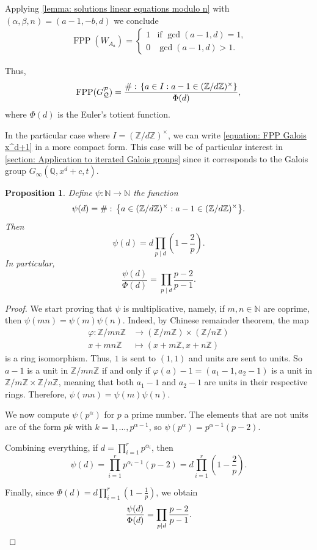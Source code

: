 \documentclass{amsart}
\def\set#1{{\def\st{\;:\;}\left\{#1\right\}}}
\def\ZZ{\mathbb Z}
\def\QQ{\mathbb Q}
\def\NN{\mathbb N}
\DeclareMathOperator{\FPP}{FPP}
\DeclareMathOperator{\st}{st}
\newtheorem{Proposition}{Proposition}[section]
\begin{document}
Applying \cref{lemma: solutions linear equations modulo n} with $(\alpha, \beta, n) = (a-1, -b, d)$ we conclude  
\begin{align*}
\FPP(W_{A_a}) = \left \{ \begin{matrix} 1 & \mbox{if $\gcd(a-1,d) = 1$,} \\ 
0 & \mbox{$\gcd(a-1,d) > 1$.}
\end{matrix}\right.
\end{align*}

Thus,
\begin{align}
\FPP(G_\mathcal{Q}^\mathcal{P}) = \frac{\#\set{a \in I: a-1 \in (\ZZ/d\ZZ)^\times}}{\Phi(d)},
\label{equation: FPP Galois x^d+1}
\end{align}
where $\Phi(d)$ is the Euler's totient function. 

In the particular case where $I = (\ZZ/d\ZZ)^\times$, we can write \cref{equation: FPP Galois x^d+1} in a more compact form. This case will be of particular interest in \cref{section: Application to iterated Galois groups} since it corresponds to the Galois group $G_\infty(\QQ, x^d+c,t)$.

\begin{Proposition}
Define $\psi: \NN \rightarrow \NN$ the function $$\psi(d) = \# \set{a \in (\ZZ/d\ZZ)^\times: a-1 \in (\ZZ/d\ZZ)^\times}.$$ Then $$\psi(d) = d \prod_{p \mid d} \left( 1 - \frac{2}{p} \right).$$ In particular, $$\frac{\psi(d)}{\Phi(d)} = \prod_{p \mid d} \frac{p-2}{p-1}.$$
\label{proposition: psi function invertibles modulo n}
\end{Proposition}

\begin{proof}
We start proving that $\psi$ is multiplicative, namely, if $m,n \in \NN$ are coprime, then $\psi(mn) = \psi(m) \psi(n)$. Indeed, by Chinese remainder theorem, the map
\begin{align*}
\varphi: \ZZ/mn\ZZ & \rightarrow (\ZZ/m\ZZ) \times (\ZZ/n \ZZ) \\
x + mn \ZZ & \mapsto (x + m \ZZ, x + n \ZZ)
\end{align*}
is a ring isomorphism. Thus, $1$ is sent to $(1,1)$ and units are sent to units. So $a-1$ is a unit in $\ZZ/mn\ZZ$ if and only if $\varphi(a) - 1 = (a_1-1,a_2-1)$ is a unit in $\ZZ/m\ZZ \times \ZZ/n\ZZ$, meaning that both $a_1-1$ and $a_2-1$ are units in their respective rings. Therefore, $\psi(mn) = \psi(m)\psi(n)$. 

We now compute $\psi(p^\alpha)$ for $p$ a prime number. The elements that are not units are of the form $pk$ with $k = 1,\dots,p^{\alpha-1}$, so $\psi(p^\alpha) = p^{\alpha-1}(p-2)$. 

Combining everything, if $d = \prod_{i = 1}^r p^{\alpha_i}$, then $$\psi(d) = \prod_{i = 1}^r p^{\alpha_i-1}(p-2) = d \prod_{i = 1}^r \left(1 - \frac{2}{p} \right).$$

Finally, since $\Phi(d) = d \prod_{i = 1}^r \left(1 - \frac{1}{p} \right)$, we obtain 
\begin{equation*}
\frac{\psi(d)}{\Phi(d)} = \prod_{p \mid d} \frac{p-2}{p-1}. \qedhere
\end{equation*}


\end{proof}
\end{document}
